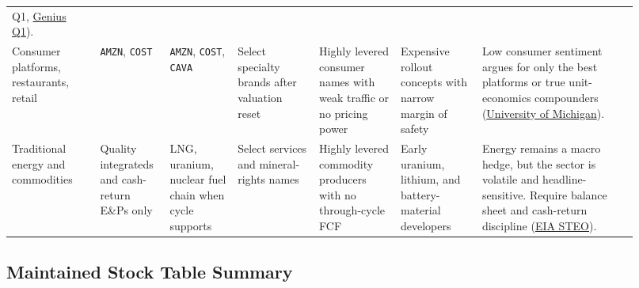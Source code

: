 \documentclass[
  9pt,
]{article}
\begin{document}
\begin{longtable}[]{@{}L{0.13\linewidth}L{0.10\linewidth}L{0.10\linewidth}L{0.12\linewidth}L{0.12\linewidth}L{0.12\linewidth}L{0.23\linewidth}@{}}
{Q1},
\href{https://investors.geniussports.com/news/news-details/2026/Genius-Sports-Reports-31-Revenue-Growth-and-21-Adjusted-EBITDA-Growth-Raises-2026-Guidance-Targeting-28-Adjusted-EBITDA-Margin-Following-Legend-Acquisition/default.aspx}{Genius
Q1}). \\
Consumer platforms, restaurants, retail & \texttt{AMZN}, \texttt{COST} &
\texttt{AMZN}, \texttt{COST}, \texttt{CAVA} & Select specialty brands
after valuation reset & Highly levered consumer names with weak traffic
or no pricing power & Expensive rollout concepts with narrow margin of
safety & Low consumer sentiment argues for only the best platforms or
true unit-economics compounders
(\href{https://www.sca.isr.umich.edu/}{University of Michigan}). \\
Traditional energy and commodities & Quality integrateds and cash-return
E\&Ps only & LNG, uranium, nuclear fuel chain when cycle supports &
Select services and mineral-rights names & Highly levered commodity
producers with no through-cycle FCF & Early uranium, lithium, and
battery-material developers & Energy remains a macro hedge, but the
sector is volatile and headline-sensitive. Require balance sheet and
cash-return discipline (\href{https://www.eia.gov/outlooks/steo/}{EIA
STEO}). \\
\bottomrule
\end{longtable}
\normalsize

\hypertarget{maintained-stock-table-summary}{%
\subsection{Maintained Stock Table
Summary}\label{maintained-stock-table-summary}}
\end{document}
